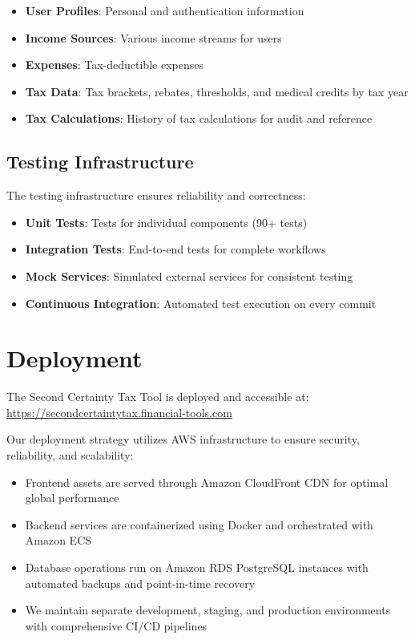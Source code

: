 \documentclass[
  11pt,
  letterpaper,
]{article}
\providecommand{\tightlist}{%
  \setlength{\itemsep}{0pt}\setlength{\parskip}{0pt}}\usepackage{longtable,booktabs,array}
\begin{document}
\begin{itemize}
\tightlist
\item
  \textbf{User Profiles}: Personal and authentication information
\item
  \textbf{Income Sources}: Various income streams for users
\item
  \textbf{Expenses}: Tax-deductible expenses
\item
  \textbf{Tax Data}: Tax brackets, rebates, thresholds, and medical
  credits by tax year
\item
  \textbf{Tax Calculations}: History of tax calculations for audit and
  reference
\end{itemize}

\hypertarget{testing-infrastructure}{%
\subsection{Testing Infrastructure}\label{testing-infrastructure}}

The testing infrastructure ensures reliability and correctness:

\begin{itemize}
\tightlist
\item
  \textbf{Unit Tests}: Tests for individual components (90+ tests)
\item
  \textbf{Integration Tests}: End-to-end tests for complete workflows
\item
  \textbf{Mock Services}: Simulated external services for consistent
  testing
\item
  \textbf{Continuous Integration}: Automated test execution on every
  commit
\end{itemize}

\hypertarget{deployment}{%
\section{Deployment}\label{deployment}}

The Second Certainty Tax Tool is deployed and accessible at:
\url{https://secondcertaintytax.financial-tools.com}

Our deployment strategy utilizes AWS infrastructure to ensure security,
reliability, and scalability:

\begin{itemize}
\tightlist
\item
  Frontend assets are served through Amazon CloudFront CDN for optimal
  global performance
\item
  Backend services are containerized using Docker and orchestrated with
  Amazon ECS
\item
  Database operations run on Amazon RDS PostgreSQL instances with
  automated backups and point-in-time recovery
\item
  We maintain separate development, staging, and production environments
  with comprehensive CI/CD pipelines
\end{itemize}
\end{document}
